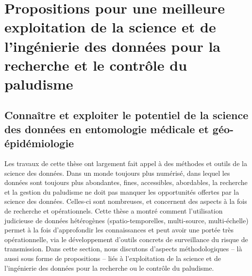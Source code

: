\documentclass[12pt,twoside]{reedthesis}
\begin{document}
\hypertarget{propositions-pour-une-meilleure-exploitation-de-la-science-et-de-linguxe9nierie-des-donnuxe9es-pour-la-recherche-et-le-contruxf4le-du-paludisme}{%
\section{Propositions pour une meilleure exploitation de la science et de l'ingénierie des données pour la recherche et le contrôle du paludisme}\label{propositions-pour-une-meilleure-exploitation-de-la-science-et-de-linguxe9nierie-des-donnuxe9es-pour-la-recherche-et-le-contruxf4le-du-paludisme}}

\hypertarget{potentiel-data-science}{%
\subsection{Connaître et exploiter le potentiel de la science des données en entomologie médicale et géo-épidémiologie}\label{potentiel-data-science}}

Les travaux de cette thèse ont largement fait appel à des méthodes et outils de la science des données. Dans un monde toujours plus numérisé, dans lequel les données sont toujours plus abondantes, fines, accessibles, abordables, la recherche et la gestion du paludisme ne doit pas manquer les opportunités offertes par la science des données. Celles-ci sont nombreuses, et concernent des aspects à la fois de recherche et opérationnels. Cette thèse a montré comment l'utilisation judicieuse de données hétérogènes (spatio-temporelles, multi-source, multi-échelle) permet à la fois d'approfondir les connaissances et peut avoir une portée très opérationnelle, via le développement d'outils concrets de surveillance du risque de transmission. Dans cette section, nous discutons d'aspects méthodologiques -- là aussi sous forme de propositions -- liés à l'exploitation de la science et de l'ingénierie des données pour la recherche ou le contrôle du paludisme.\\
\end{document}

